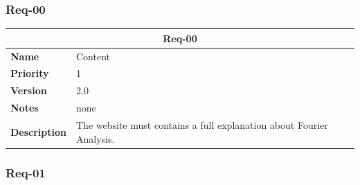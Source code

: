 \documentclass{article}
\begin{document}
\subsubsection{Req-00}

\bgroup{}
\def\arraystretch{1.25}
\begin{center}
    \begin{tabular}{ |l|p{9cm}| }
        \hline
        \multicolumn{2}{|c|}{\textbf{Req-00}} \\
        \hline
        \textbf{Name} & Content \\
        \hline
        \textbf{Priority} & 1 \\
        \hline
        \textbf{Version} & 2.0 \\
        \hline
        \textbf{Notes} & none \\
        \hline
        \textbf{Description}
        & The website must contains a full explanation about Fourier Analysis. \\
        \hline
    \end{tabular}
\end{center}
\egroup{}

\subsubsection{Req-01}
\end{document}
